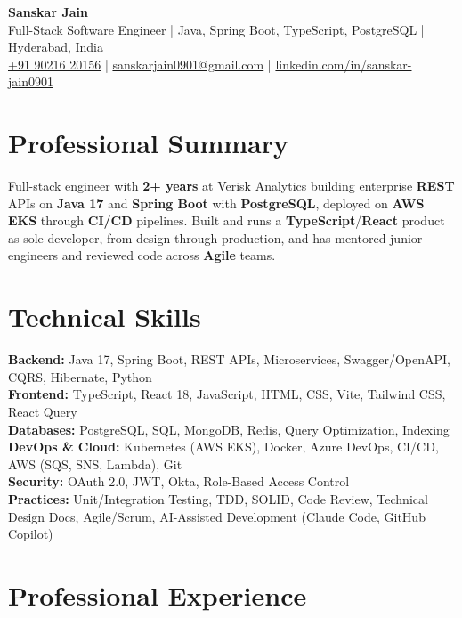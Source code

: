 \documentclass[a4paper,10pt]{article}
\begin{document}
\begin{center}
    {\LARGE \textbf{Sanskar Jain}} \\
    \vspace{2pt}
    Full-Stack Software Engineer \;|\; Java, Spring Boot, TypeScript, PostgreSQL \;|\; Hyderabad, India \\
    \href{tel:+919021620156}{+91 90216 20156} \;|\;
    \href{mailto:sanskarjain0901@gmail.com}{sanskarjain0901@gmail.com} \;|\;
    \href{https://www.linkedin.com/in/sanskar-jain0901/}{linkedin.com/in/sanskar-jain0901}
\end{center}

\section*{Professional Summary}
Full-stack engineer with \textbf{2+ years} at Verisk Analytics building enterprise \textbf{REST} APIs on \textbf{Java 17} and \textbf{Spring Boot} with \textbf{PostgreSQL}, deployed on \textbf{AWS EKS} through \textbf{CI/CD} pipelines. Built and runs a \textbf{TypeScript}/\textbf{React} product as sole developer, from design through production, and has mentored junior engineers and reviewed code across \textbf{Agile} teams.

\section*{Technical Skills}
\begin{sloppypar}
\noindent
\textbf{Backend:} Java 17, Spring Boot, REST APIs, Microservices, Swagger/OpenAPI, CQRS, Hibernate, Python \\
\textbf{Frontend:} TypeScript, React 18, JavaScript, HTML, CSS, Vite, Tailwind CSS, React Query \\
\textbf{Databases:} PostgreSQL, SQL, MongoDB, Redis, Query Optimization, Indexing \\
\textbf{DevOps \& Cloud:} Kubernetes (AWS EKS), Docker, Azure DevOps, CI/CD, AWS (SQS, SNS, Lambda), Git \\
\textbf{Security:} OAuth 2.0, JWT, Okta, Role-Based Access Control \\
\textbf{Practices:} Unit/Integration Testing, TDD, SOLID, Code Review, Technical Design Docs, Agile/Scrum, AI-Assisted Development (Claude Code, GitHub Copilot)
\end{sloppypar}

\section*{Professional Experience}
\end{document}
